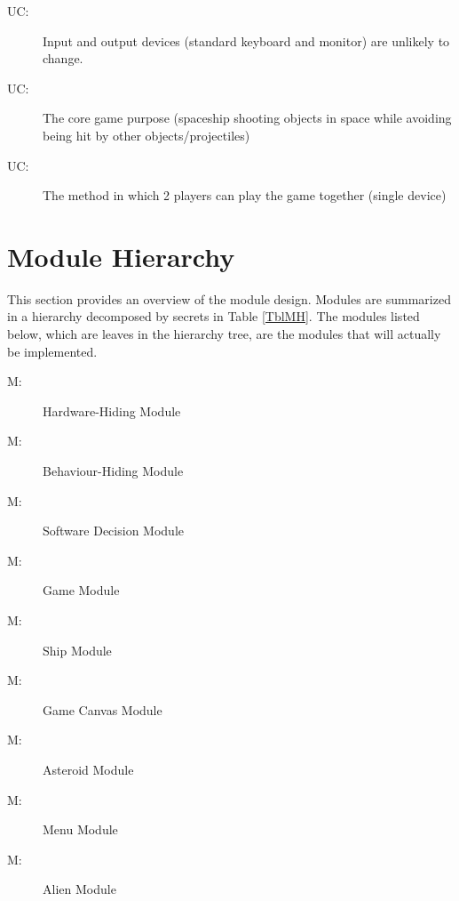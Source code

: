 \documentclass[12pt, titlepage]{article}
\newcounter{ucnum}
\newcommand{\uctheucnum}{UC\theucnum}
\newcounter{mnum}
\newcommand{\mthemnum}{M\themnum}
\begin{document}
\begin{description}
\item[ \uctheucnum \label{ucIO}:] Input and output devices (standard keyboard and monitor) are unlikely to change.
\item[ \uctheucnum \label{ucInput}:] The core game purpose (spaceship shooting objects in space while avoiding being hit by other objects/projectiles)
\item[ \uctheucnum \label{ucInput}:] The method in which 2 players can play the game together (single device)
\end{description}

\section{Module Hierarchy} \label{SecMH}

This section provides an overview of the module design. Modules are summarized
in a hierarchy decomposed by secrets in Table \ref{TblMH}. The modules listed
below, which are leaves in the hierarchy tree, are the modules that will
actually be implemented.

\begin{description}
\item [ \mthemnum \label{mHH}:] Hardware-Hiding Module
\item [ \mthemnum \label{mBH}:] Behaviour-Hiding Module
\item [ \mthemnum \label{mSD}:] Software Decision Module
\item [ \mthemnum \label{mG}:] Game Module
\item [ \mthemnum \label{mS}:] Ship Module
\item [ \mthemnum \label{mGC}:] Game Canvas Module
\item [ \mthemnum \label{mA}:] Asteroid Module
\item [ \mthemnum \label{mM}:] Menu Module
\item [ \mthemnum \label{mE}:] Alien Module
\end{description}
\end{document}
